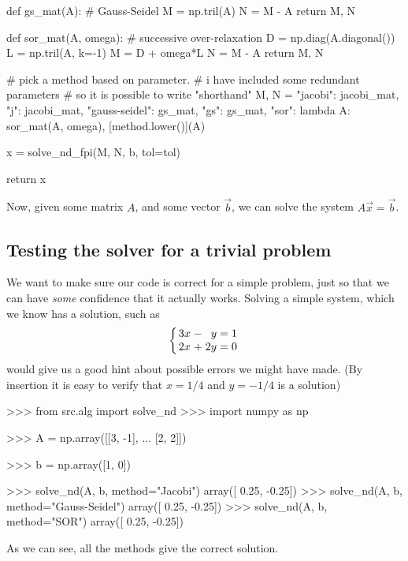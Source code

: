 \documentclass[12pt]{article}
\begin{document}
\begin{multicols}{2}
\begin{python}[
        caption={Argument-``parser'' and choice of $M$, $N$.}
    ]
    def gs_mat(A):
        # Gauss-Seidel
        M = np.tril(A)
        N = M - A
        return M, N

    def sor_mat(A, omega):
        # successive over-relaxation
        D = np.diag(A.diagonal())
        L = np.tril(A, k=-1)
        M = D + omega*L
        N = M - A
        return M, N

    # pick a method based on parameter.
    # i have included some redundant parameters
    # so it is possible to write "shorthand"
    M, N = {
        "jacobi":        jacobi_mat,
        "j":             jacobi_mat,
        "gauss-seidel":  gs_mat,
        "gs":            gs_mat,
        "sor": lambda A: sor_mat(A, omega),
    }[method.lower()](A)

    x = solve_nd_fpi(M, N, b, tol=tol)

    return x
    \end{python}
    Now, given some matrix $A$, and some vector $\vec b$,
    we can solve the system $A\vec x = \vec b$.

    \subsection*{Testing the solver for a trivial problem}
    We want to make sure our code is correct for a simple problem,
    just so that we can have {\em some} confidence that it actually
    works.
    Solving a simple system, which we know has a solution,
    such as
    \[
        \arraycolsep=1.4pt\def\arraystretch{1}
        \left\{\begin{array}{rcrcr}
            3x &-&  y &=&  1 \\
            2x &+& 2y &=&  0 \\
        \end{array}\right.
    \]
    would give us a good hint about possible errors we might have made.
    (By insertion it is easy to verify that $x = 1/4$ and $y = -1/4$ is a solution)
    \begin{python}
>>> from src.alg import solve_nd
>>> import numpy as np

>>> A = np.array([[3, -1],
...               [2,  2]])

>>> b = np.array([1, 0])

>>> solve_nd(A, b, method="Jacobi")
array([ 0.25, -0.25])
>>> solve_nd(A, b, method="Gauss-Seidel")
array([ 0.25, -0.25])
>>> solve_nd(A, b, method="SOR")
array([ 0.25, -0.25])
    \end{python}
    As we can see, all the methods give the correct solution.


\end{multicols}
\end{document}
